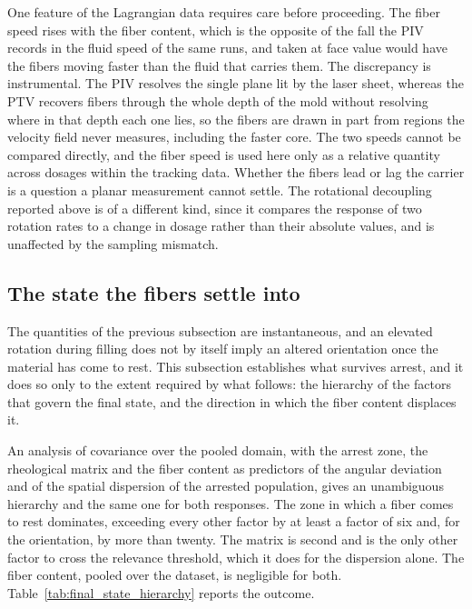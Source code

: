 \documentclass[%
  aip,
  pof,          %
  reprint,      %
  floatfix
]{revtex4-2}
\begin{document}
One feature of the Lagrangian data requires care before proceeding. The fiber speed rises with the fiber content, which is the opposite of the fall the PIV records in the fluid speed of the same runs, and taken at face value would have the fibers moving faster than the fluid that carries them. The discrepancy is instrumental. The PIV resolves the single plane lit by the laser sheet, whereas the PTV recovers fibers through the whole depth of the mold without resolving where in that depth each one lies, so the fibers are drawn in part from regions the velocity field never measures, including the faster core. The two speeds cannot be compared directly, and the fiber speed is used here only as a relative quantity across dosages within the tracking data. Whether the fibers lead or lag the carrier is a question a planar measurement cannot settle. The rotational decoupling reported above is of a different kind, since it compares the response of two rotation rates to a change in dosage rather than their absolute values, and is unaffected by the sampling mismatch.

\subsection{The state the fibers settle into}
\label{sec:results_final_state}

The quantities of the previous subsection are instantaneous, and an elevated rotation during filling does not by itself imply an altered orientation once the material has come to rest. This subsection establishes what survives arrest, and it does so only to the extent required by what follows: the hierarchy of the factors that govern the final state, and the direction in which the fiber content displaces it.

An analysis of covariance over the pooled domain, with the arrest zone, the rheological matrix and the fiber content as predictors of the angular deviation and of the spatial dispersion of the arrested population, gives an unambiguous hierarchy and the same one for both responses. The zone in which a fiber comes to rest dominates, exceeding every other factor by at least a factor of six and, for the orientation, by more than twenty. The matrix is second and is the only other factor to cross the relevance threshold, which it does for the dispersion alone. The fiber content, pooled over the dataset, is negligible for both. Table~\ref{tab:final_state_hierarchy} reports the outcome.
\end{document}
